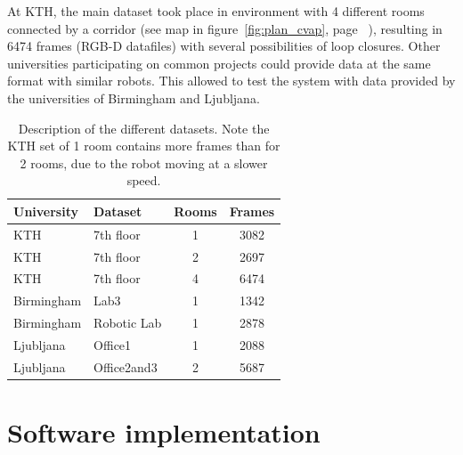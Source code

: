 At KTH, the main dataset took place in environment with 4 different rooms connected by a corridor (see map in figure~\ref{fig:plan_cvap}, page ~\pageref{fig:plan_cvap}), resulting in 6474 frames (RGB-D datafiles) with several possibilities of loop closures. Other universities participating on common projects could provide data at the same format with similar robots. This allowed to test the system with data provided by the universities of Birmingham and Ljubljana.

\begin{table}[H]
 \begin{center}
  \begin{tabular}{llcc}
  \hline
  University & Dataset & Rooms & Frames \\
  \hline
  KTH & 7th floor & 1 & 3082 \\
  KTH & 7th floor & 2 & 2697 \\
  KTH & 7th floor & 4 & 6474 \\
  Birmingham & Lab3 & 1 & 1342 \\
  Birmingham & Robotic Lab & 1 & 2878 \\
  Ljubljana & Office1 & 1 & 2088 \\
  Ljubljana & Office2and3 & 2 & 5687 \\
  \hline
  \end{tabular}
 \end{center}
 \caption{Description of the different datasets. Note the KTH set of 1 room contains more frames than for 2 rooms, due to the robot moving at a slower speed.}
 \label{tab:datasets}
\end{table}

\section{Software implementation}

